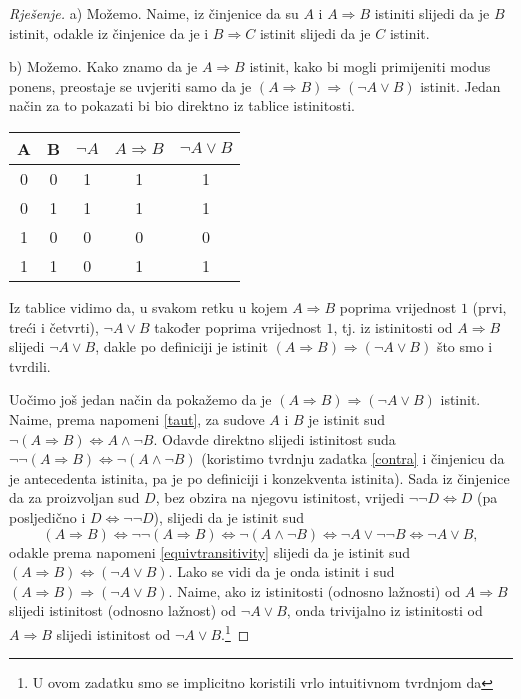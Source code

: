 \begin{proof}[Rješenje]
a) Možemo. Naime, iz činjenice da su $A$ i $A\Rightarrow B$ istiniti slijedi da je $B$ istinit, odakle iz činjenice da je i $B\Rightarrow C$ istinit slijedi da je $C$ istinit.

b) Možemo. Kako znamo da je $A\Rightarrow B$ istinit, kako bi mogli primijeniti modus ponens, preostaje se uvjeriti samo da je $(A\Rightarrow B)\Rightarrow (\neg A\vee B)$ istinit. Jedan način za to pokazati bi bio direktno iz tablice istinitosti.
\begin{center}
\begin{tabular}{ |c|c||c|c|c| } 
 \hline
 A & B & $\neg A$ & $A\Rightarrow B$ & $\neg A\vee B$\\
 \hline \hline
 0 & 0 & 1 & 1 & 1 \\ 
 0 & 1 & 1 & 1 & 1 \\ 
 1 & 0 & 0 & 0 & 0 \\
 1 & 1 & 0 & 1 & 1 \\
 \hline
\end{tabular}
\end{center}
Iz tablice vidimo da, u svakom retku u kojem $A\Rightarrow B$ poprima vrijednost $1$ (prvi, treći i četvrti), $\neg A\vee B$ također poprima vrijednost $1$, tj. iz istinitosti od $A\Rightarrow B$ slijedi $\neg A\vee B$, dakle po definiciji je istinit $(A\Rightarrow B)\Rightarrow (\neg A\vee B)$ što smo i tvrdili. 

Uočimo još jedan način da pokažemo da je $(A\Rightarrow B)\Rightarrow (\neg A\vee B)$ istinit. Naime, prema napomeni \ref{taut}, za sudove $A$ i $B$ je istinit sud $\neg(A\Rightarrow B)\Leftrightarrow A\wedge \neg B$. Odavde direktno slijedi istinitost suda $\neg\neg(A\Rightarrow B)\Leftrightarrow \neg(A\wedge \neg B)$ (koristimo tvrdnju zadatka \ref{contra} i činjenicu da je antecedenta istinita, pa je po definiciji i konzekventa istinita).  Sada iz činjenice da za proizvoljan sud $D$, bez obzira na njegovu istinitost, vrijedi $\neg\neg D\Leftrightarrow D$ (pa posljedično i $D\Leftrightarrow \neg\neg D$), slijedi da je istinit sud
$$(A\Rightarrow B)\Leftrightarrow \neg\neg (A\Rightarrow B) \Leftrightarrow \neg(A\wedge \neg B)\Leftrightarrow \neg A \vee \neg\neg B\Leftrightarrow \neg A\vee B,$$
odakle prema napomeni \ref{equivtransitivity} slijedi da je istinit sud $(A\Rightarrow B)\Leftrightarrow (\neg A\vee B)$. Lako se vidi da je onda istinit i sud $(A\Rightarrow B)\Rightarrow (\neg A\vee B)$. Naime, ako iz istinitosti (odnosno lažnosti) od $A\Rightarrow B$ slijedi istinitost (odnosno lažnost) od $\neg A\vee B$, onda trivijalno iz istinitosti od $A\Rightarrow B$ slijedi istinitost od $\neg A\vee B$.\footnote{U ovom zadatku smo se implicitno koristili vrlo intuitivnom tvrdnjom da}
\end{proof}
